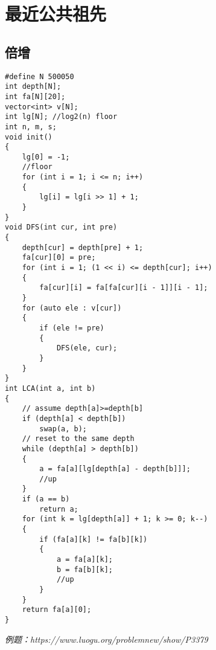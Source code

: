 \section{最近公共祖先}
\subsection{倍增}
\begin{lstlisting}
#define N 500050
int depth[N];
int fa[N][20];
vector<int> v[N];
int lg[N]; //log2(n) floor
int n, m, s;
void init()
{
    lg[0] = -1;
    //floor
    for (int i = 1; i <= n; i++)
    {
        lg[i] = lg[i >> 1] + 1;
    }
}
void DFS(int cur, int pre)
{
    depth[cur] = depth[pre] + 1;
    fa[cur][0] = pre;
    for (int i = 1; (1 << i) <= depth[cur]; i++)
    {
        fa[cur][i] = fa[fa[cur][i - 1]][i - 1];
    }
    for (auto ele : v[cur])
    {
        if (ele != pre)
        {
            DFS(ele, cur);
        }
    }
}
int LCA(int a, int b)
{
    // assume depth[a]>=depth[b]
    if (depth[a] < depth[b])
        swap(a, b);
    // reset to the same depth
    while (depth[a] > depth[b])
    {
        a = fa[a][lg[depth[a] - depth[b]]];
        //up
    }
    if (a == b)
        return a;
    for (int k = lg[depth[a]] + 1; k >= 0; k--)
    {
        if (fa[a][k] != fa[b][k])
        {
            a = fa[a][k];
            b = fa[b][k];
            //up
        }
    }
    return fa[a][0];
}
\end{lstlisting}
\emph{例题：https://www.luogu.org/problemnew/show/P3379}